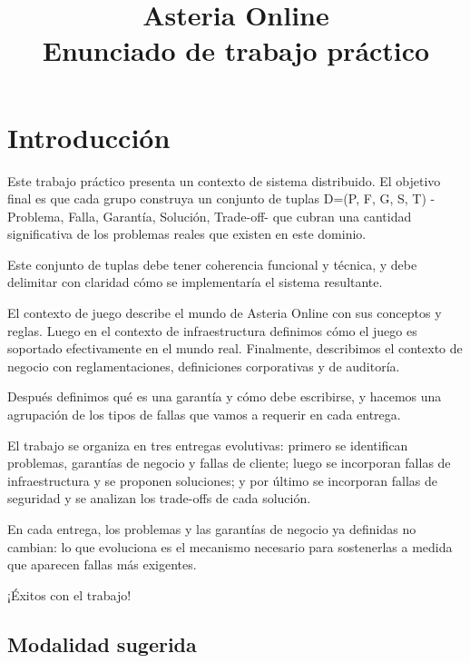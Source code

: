 \documentclass[variant=guia,cover=institutional,mode=screen]{ua-engineering-v6-article}
\title{Asteria Online\\[0.4em]\large Enunciado de trabajo práctico}
\author{\UAProfessor}
\date{\UADate}
\begin{document}
    \maketitle
    \tableofcontents
    \clearpage

    \section{Introducción}\label{sec:introduccion}

    Este trabajo práctico presenta un contexto de sistema distribuido.
    El objetivo final es que cada grupo construya un conjunto de tuplas D=(P, F, G, S, T) -Problema, Falla, Garantía, Solución, Trade-off- que cubran una cantidad significativa de los problemas reales que existen en este dominio.

    Este conjunto de tuplas debe tener coherencia funcional y técnica, y debe delimitar con claridad cómo se implementaría el sistema resultante.

    El contexto de juego describe el mundo de Asteria Online con sus conceptos y reglas.
    Luego en el contexto de infraestructura definimos cómo el juego es soportado efectivamente en el mundo real.
    Finalmente, describimos el contexto de negocio con reglamentaciones, definiciones corporativas y de auditoría.

    Después definimos qué es una garantía y cómo debe escribirse, y hacemos una agrupación de los tipos de fallas que vamos a requerir en cada entrega.

    El trabajo se organiza en tres entregas evolutivas: primero se identifican problemas, garantías de negocio y fallas de cliente; luego se incorporan fallas de infraestructura y se proponen soluciones; y por último se incorporan fallas de seguridad y se analizan los trade-offs de cada solución.

    En cada entrega, los problemas y las garantías de negocio ya definidas no cambian: lo que evoluciona es el mecanismo necesario para sostenerlas a medida que aparecen fallas más exigentes.

    ¡Éxitos con el trabajo!

    \subsection{Modalidad sugerida}\label{subsec:modalidad-sugerida}
\end{document}
